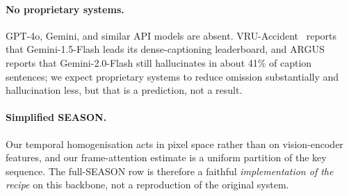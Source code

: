 \paragraph{No proprietary systems.}
GPT-4o, Gemini, and similar API models are absent.
VRU-Accident~\cite{vruaccident} reports that Gemini-1.5-Flash leads its dense-captioning leaderboard, and ARGUS~\cite{argus2025} reports that Gemini-2.0-Flash still hallucinates in about 41\% of caption sentences; we expect proprietary systems to reduce omission substantially and hallucination less, but that is a prediction, not a result.

\paragraph{Simplified SEASON.}
Our temporal homogenisation acts in pixel space rather than on vision-encoder features, and our frame-attention estimate is a uniform partition of the key sequence.
The full-SEASON row is therefore a faithful \emph{implementation of the recipe} on this backbone, not a reproduction of the original system.
